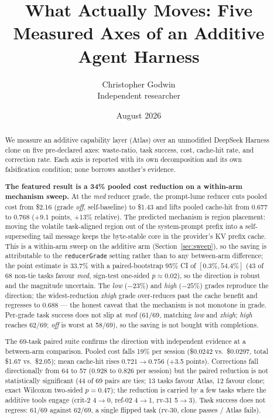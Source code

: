 \documentclass[11pt]{article}
\title{\bfseries What Actually Moves: Five Measured Axes of an Additive Agent Harness}
\author{Christopher Godwin \\ \small Independent researcher}
\date{August 2026}
\begin{document}
\maketitle

\begin{abstract}
We measure an additive capability layer (Atlas) over an unmodified DeepSeek Harness clone on five pre-declared axes: waste-ratio, task success, cost, cache-hit rate, and correction rate. Each axis is reported with its own decomposition and its own falsification condition; none borrows another's evidence.

\textbf{The featured result is a 34\% pooled cost reduction on a within-arm mechanism sweep.} At the \emph{med} reducer grade, the prompt-lume reducer cuts pooled cost from \$2.16 (grade \emph{off}, self-baseline) to \$1.43 and lifts pooled cache-hit from 0.677 to 0.768 (+9.1 points, +13\% relative). The predicted mechanism is region placement: moving the volatile task-aligned region out of the system-prompt prefix into a self-superseding tail message keeps the byte-stable core in the provider's KV prefix cache. This is a within-arm sweep on the additive arm (Section~\ref{sec:sweep}), so the saving is attributable to the \texttt{reducerGrade} setting rather than to any between-arm difference; the point estimate is 33.7\% with a paired-bootstrap 95\% CI of $[0.3\%, 54.4\%]$ (43 of 68 non-tie tasks favour \emph{med}, sign-test one-sided $p \approx 0.02$), so the direction is robust and the magnitude uncertain. The \emph{low} ($-23\%$) and \emph{high} ($-25\%$) grades reproduce the direction; the widest-reduction \emph{xhigh} grade over-reduces past the cache benefit and regresses to 0.688 --- the honest caveat that the mechanism is not monotone in grade. Per-grade task success does not slip at \emph{med} (61/69, matching \emph{low} and \emph{xhigh}; \emph{high} reaches 62/69; \emph{off} is worst at 58/69), so the saving is not bought with completions.

The 69-task paired suite confirms the direction with independent evidence at a between-arm comparison. Pooled cost falls 19\% per session (\$0.0242 vs.\ \$0.0297, total \$1.67 vs.\ \$2.05); mean cache-hit rises $0.721 \rightarrow 0.756$ (+3.5 points). Corrections fall directionally from 64 to 57 (0.928 to 0.826 per session) but the paired reduction is not statistically significant (44 of 69 pairs are ties; 13 tasks favour Atlas, 12 favour clone; exact Wilcoxon two-sided $p = 0.47$); the reduction is carried by a few tasks where the additive tools engage (crit-2 4$\rightarrow$0, ref-02 4$\rightarrow$1, rv-31 5$\rightarrow$3). Task success does not regress: 61/69 against 62/69, a single flipped task (rv-30, clone passes / Atlas fails).


\end{abstract}
\end{document}

